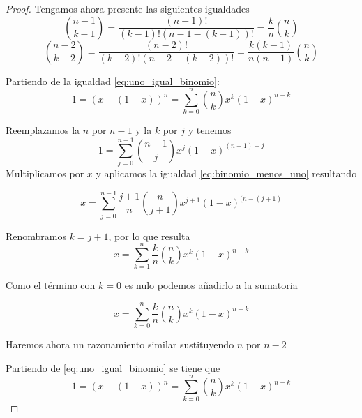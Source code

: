\begin{proof}
    Tengamos ahora presente las siguientes igualdades 
    \begin{equation} \label{eq:binomio_menos_uno}
        \binom{n-1}{k-1} = \frac{(n-1)!}{(k-1)! (n-1-(k-1))!} = \frac{k}{n} \binom{n}{k}
    \end{equation}
    \begin{equation} \label{eq:binomio_menos_dos}
        \binom{n-2}{k-2} = \frac{(n-2)!}{(k-2)! (n-2-(k-2))!} = \frac{k(k-1)}{n(n-1)} \binom{n}{k}
    \end{equation}

    Partiendo de la igualdad \eqref{eq:uno_igual_binomio}:
    \begin{equation}
        1 = (x+ (1-x))^n = \sum_{k=0}^n \binom{n}{k} x^{k} (1-x)^{n-k}
    \end{equation}

    Reemplazamos la $n$ por $n-1$ y la $k$ por $j$ y tenemos 
    \begin{equation}
        1 = \sum_{j=0}^{n-1} \binom{n-1}{j} x^{j} (1-x)^{(n-1)-j}
    \end{equation}
    Multiplicamos por $x$ y aplicamos la igualdad \eqref{eq:binomio_menos_uno} resultando 

    \begin{equation}
        x = \sum_{j=0}^{n-1} \frac{j+1}{n} \binom{n}{j+1} x^{j+1} (1-x)^{(n-(j+1)}
    \end{equation}

    Renombramos $k= j+1$, por lo que resulta
    \begin{equation}
        x = \sum_{k=1}^{n} \frac{k}{n} \binom{n}{k} x^{k} (1-x)^{n-k}
    \end{equation}

    Como el término con $k=0$ es nulo podemos añadirlo a la sumatoria
    
    \begin{equation} \label{eq:desarrollo_binomio_uno}
        x = \sum_{k=0}^{n} \frac{k}{n} \binom{n}{k} x^{k} (1-x)^{n-k}
    \end{equation}

    Haremos ahora un razonamiento similar sustituyendo $n$ por $n-2$

    Partiendo de \eqref{eq:uno_igual_binomio} se tiene que 
    \begin{equation}
        1 = (x+ (1-x))^n = \sum_{k=0}^n \binom{n}{k} x^{k} (1-x)^{n-k}
    \end{equation}


\end{proof}
